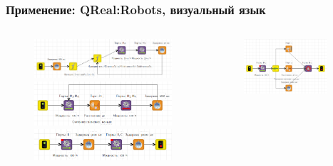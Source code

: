 \documentclass[14pt]{beamer}
\begin{document}
\begin{frame}
    \frametitle{Применение: QReal:Robots, визуальный язык}
    \begin{columns}[onlytextwidth]
       \begin{column}{0.5\textwidth}
            \begin{figure}
            	\begin{center}
             		\includegraphics[width=\textwidth]{images/presentation/language1.png}\\
             		\vspace{0.5cm}\includegraphics[width=\textwidth]{images/presentation/language2.png}\\
             		\vspace{0.5cm}\includegraphics[width=\textwidth]{images/presentation/language4.png}
            	\end{center}
            \end{figure}
        \end{column}
        \begin{column}{0.5\textwidth}
            \begin{figure}
            	\begin{center}
             		\includegraphics[width=0.9\textwidth]{images/presentation/language3.png}

\end{center}
\end{figure}
\end{column}
\end{columns}
\end{frame}
\end{document}
